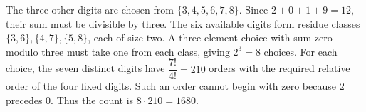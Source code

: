 The three other digits are chosen from $\{3,4,5,6,7,8\}$. Since $2+0+1+9=12$, their sum must be divisible by three. The six available digits form residue classes $\{3,6\},\{4,7\},\{5,8\}$, each of size two. A three-element choice with sum zero modulo three must take one from each class, giving $2^3=8$ choices. For each choice, the seven distinct digits have $\dfrac{7!}{4!}=210$ orders with the required relative order of the four fixed digits. Such an order cannot begin with zero because $2$ precedes $0$. Thus the count is $\boxed{8\cdot210=1680}$.
